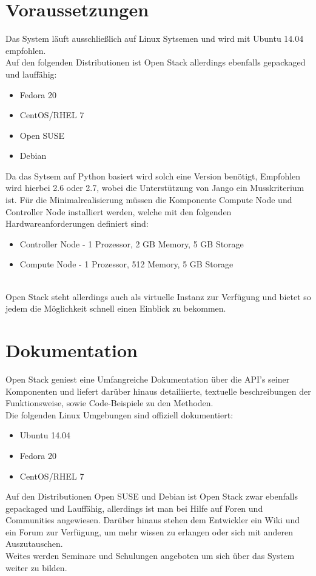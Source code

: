 \documentclass[a4paper,nochapterprefix,english,12pt]{scrreprt}
\begin{document}
\section{Voraussetzungen}
Das System läuft ausschließlich auf Linux Sytsemen und wird mit Ubuntu 14.04 empfohlen.\\
Auf den folgenden Distributionen ist Open Stack allerdings ebenfalls gepackaged und lauffähig:
\begin{itemize}
	\item Fedora 20
	\item CentOS/RHEL 7
	\item Open SUSE
	\item Debian
\end{itemize}
Da das Sytsem auf Python basiert wird solch eine Version benötigt, Empfohlen wird hierbei 2.6 oder 2.7, wobei die Unterstützung von Jango ein Musskriterium ist.
Für die Minimalrealisierung müssen die Komponente Compute Node und Controller Node installiert werden, welche mit den folgenden Hardwareanforderungen definiert sind:\\
\begin{itemize}
	\item Controller Node - 1 Prozessor, 2 GB Memory, 5 GB Storage
	\item Compute Node - 1 Prozessor, 512 Memory, 5 GB Storage\\\\
\end{itemize}
Open Stack steht allerdings auch als virtuelle Instanz zur Verfügung und bietet so jedem die Möglichkeit schnell einen Einblick zu bekommen. \cite{OS-BasicEnvironment} \\
\section{Dokumentation}
Open Stack geniest eine Umfangreiche Dokumentation über die API's seiner Komponenten und liefert darüber hinaus detailiierte, textuelle beschreibungen der Funktionsweise, sowie Code-Beispiele zu den Methoden.\\
Die folgenden Linux Umgebungen sind offiziell dokumentiert:
\begin{itemize}
	\item Ubuntu 14.04
	\item Fedora 20
	\item CentOS/RHEL 7
\end{itemize}
Auf den Distributionen Open SUSE und Debian ist Open Stack zwar ebenfalls gepackaged und Lauffähig, allerdings ist man bei Hilfe auf Foren und Communities angewiesen.
Darüber hinaus stehen dem Entwickler ein Wiki und ein Forum zur Verfügung, um mehr wissen zu erlangen oder sich mit anderen Auszutauschen.\\
Weites werden Seminare und Schulungen angeboten um sich über das System weiter zu bilden. \cite{OS-Docs}
\end{document}
